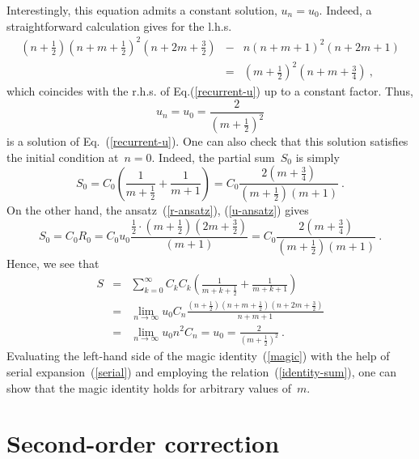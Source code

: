 \documentclass[preprint,aps,prb]{revtex4}
\begin{document}
Interestingly, this equation admits a constant solution, $u_n = u_0$. 
Indeed, 
a straightforward calculation gives for the l.h.s.
\begin{eqnarray}
\left(n + \frac{1}{2}\right)
\left(n + m + \frac{1}{2}\right)^2
\left(n + 2 m + \frac{3}{2}\right)
&-& n 
\left(n + m + 1\right)^2
\left(n + 2 m + 1\right)
\\
\nonumber
 &=& \left(m + \frac{1}{2}\right)^2 \left( n + m + \frac{3}{4}\right)
 \ , 
\end{eqnarray}
which coincides with the r.h.s. of Eq.(\ref{recurrent-u}) 
up to a constant factor. 
Thus, 
\begin{equation}
u_n = u_0 = \frac{2}{\left(m + \frac{1}{2}\right)^2}
\end{equation}
is a solution of Eq.~(\ref{recurrent-u}). One can also check that
this solution satisfies the initial condition at~$n = 0$. Indeed, 
the partial sum~$S_0$ is simply  
\begin{equation}
S_0 = C_0 \left(\frac{1}{m + \frac{1}{2}} + \frac{1}{m + 1}\right)
= C_0 \frac{2 \left(m + \frac{3}{4}\right)}{\left(m + \frac{1}{2}\right)
\left(m + 1\right)}
\ .
\end{equation}
On the other hand, the ansatz~(\ref{r-ansatz}), (\ref{u-ansatz}) gives
\begin{equation}
S_0 = C_0 R_0 = C_0 u_0 
\frac{\frac{1}{2}\cdot\left(m + \frac{1}{2}\right) 
\left(2m + \frac{3}{2}\right)}{\left(m + 1\right)}
= C_0 \frac{2 \left(m + \frac{3}{4}\right)}{\left(m + \frac{1}{2}\right)
\left(m + 1\right)} 
\ .
\end{equation}
Hence, we see that  
\begin{eqnarray}
\label{identity-sum}
S &=& \sum_{k = 0}^{\infty} C_k 
C_k
\left( \frac{1}{m + k + \frac{1}{2}} + \frac{1}{m + k + 1}   \right) 
\\
\nonumber
&=& 
\lim_{n \to \infty} u_0 C_n \frac{\left(n + \frac{1}{2}\right)
\left(n + m + \frac{1}{2}\right)
\left(n + 2 m + \frac{3}{2}\right)}{n + m + 1} 
\nonumber
\\
&=& \lim_{n \to \infty }u_0 n^2 C_n = u_0  
= \frac{2}{\left(m + \frac{1}{2}\right)^2}
\ .
\end{eqnarray}
Evaluating the left-hand side of the 
magic identity~(\ref{magic}) with the help of serial
expansion~(\ref{serial}) and employing the
relation~(\ref{identity-sum}), one can 
show that the magic identity holds for arbitrary values of~$m$. 

\section{Second-order correction}
\end{document}
